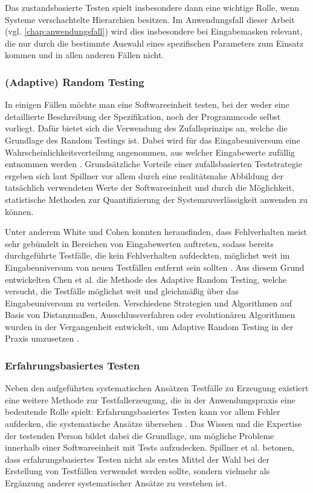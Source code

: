 Das zustandsbasierte Testen spielt insbesondere dann eine wichtige Rolle, wenn Systeme verschachtelte Hierarchien besitzen. Im Anwendungsfall dieser Arbeit (vgl. \autoref{chap:anwendungsfall}) wird dies insbesondere bei Eingabemasken relevant, die nur durch die bestimmte Auswahl eines spezifischen Parameters zum Einsatz kommen und in allen anderen Fällen nicht. 

\subsubsection{(Adaptive) Random Testing}

In einigen Fällen möchte man eine Softwareeinheit testen, bei der weder eine detaillierte Beschreibung der Spezifikation, noch der Programmcode selbst vorliegt. Dafür bietet sich die Verwendung des Zufallsprinzips an, welche die Grundlage des Random Testings ist. Dabei wird für das Eingabeuniversum eine Wahrscheinlichkeitsverteilung angenommen, aus welcher Eingabewerte zufällig entnommen werden \cite[S. 141 f.]{spillner2011software}. Grundsätzliche Vorteile einer zufallsbasierten Teststrategie ergeben sich laut Spillner \cite[S. 142]{spillner2011software} vor allem durch eine realitätsnahe Abbildung der tatsächlich verwendeten Werte der Softwareeinheit und durch die Möglichkeit, statistische Methoden zur Quantifizierung der Systemzuverlässigkeit anwenden zu können.

Unter anderem White und Cohen \cite{white1980domain} konnten herausfinden, dass Fehlverhalten meist sehr gebündelt in Bereichen von Eingabewerten auftreten, sodass bereits durchgeführte Testfälle, die kein Fehlverhalten aufdeckten, möglichst weit im Eingabeuniversum von neuen Testfällen entfernt sein sollten \cite{survey2013}. Aus diesem Grund entwickelten Chen et al. \cite{chen2004adaptive} die Methode des Adaptive Random Testing, welche versucht, die Testfälle möglichst weit und gleichmäßig über das Eingabeuniversum zu verteilen. Verschiedene Strategien und Algorithmen auf Basis von Distanzmaßen, Ausschlussverfahren oder evolutionären Algorithmen wurden in der Vergangenheit entwickelt, um Adaptive Random Testing in der Praxis umzusetzen \cite{huang2012adaptive}.

\subsubsection{Erfahrungsbasiertes Testen}

Neben den aufgeführten systematischen Ansätzen Testfälle zu Erzeugung existiert eine weitere Methode zur Testfallerzeugung, die in der Anwendungspraxis eine bedeutende Rolle spielt: Erfahrungsbasiertes Testen kann vor allem Fehler aufdecken, die systematische Ansätze übersehen \cite{spillner Basiswissen}. Das Wissen und die Expertise der testenden Person bildet dabei die Grundlage, um mögliche Probleme innerhalb einer Softwareeinheit mit Tests aufzudecken. Spillner et al. \cite[S. 159]{spillner2011software} betonen, dass erfahrungsbasiertes Testen nicht als erstes Mittel der Wahl bei der Erstellung von Testfällen verwendet werden sollte, sondern vielmehr als Ergänzung anderer systematischer Ansätze zu verstehen ist. 

